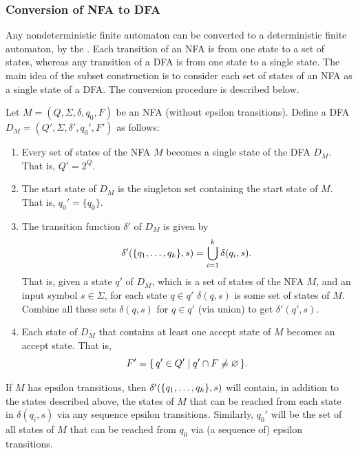 \subsubsection{Conversion of NFA to DFA}

Any nondeterministic finite automaton can be converted to a deterministic finite automaton, by the . Each transition of an NFA is from one state to a set of states, whereas any transition of a DFA is from one state to a single state. The main idea of the subset construction is to consider each set of states of an NFA as a single state of a DFA. The conversion procedure is described below.

Let $M = (Q, \Sigma, \delta, q_0, F)$ be an NFA (without epsilon transitions). Define a DFA $D_M = (Q', \Sigma, \delta', q_0', F')$ as follows:
\begin{enumerate}
\item Every set of states of the NFA $M$ becomes a single state of the DFA $D_M$. That is, $Q' = 2^Q$.
\item The start state of $D_M$ is the singleton set containing the start state of $M$. That is, $q_0' = \{q_0\}$.
\item The transition function $\delta'$ of $D_M$ is given by
\begin{equation*}
\delta'\pqty{ \{q_1, \ldots, q_k\}, s } = \bigcup_{i=1}^k \delta(q_i, s).
\end{equation*}
That is, given a state $q'$ of $D_M$, which is a set of states of the NFA $M$, and an input symbol $s \in \Sigma$, for each state $q \in q'$ $\delta(q, s)$ is some set of states of $M$. Combine all these sets $\delta(q, s)$ for $q \in q'$ (via union) to get $\delta'(q', s)$.
\item Each state of $D_M$ that contains at least one accept state of $M$ becomes an accept state. That is,
\begin{equation*}
F' = \qty{\, q' \in Q' \mid q' \cap F \ne \varnothing \,}.
\end{equation*}
\end{enumerate}

If $M$ has epsilon transitions, then $\delta'\pqty{ \{q_1, \ldots, q_k\}, s }$ will contain, in addition to the states described above, the states of $M$ that can be reached from each state in $\delta(q_i, s)$ via any sequence epsilon transitions. Similarly, $q_0'$ will be the set of all states of $M$ that can be reached from $q_0$ via (a sequence of) epsilon transitions.

